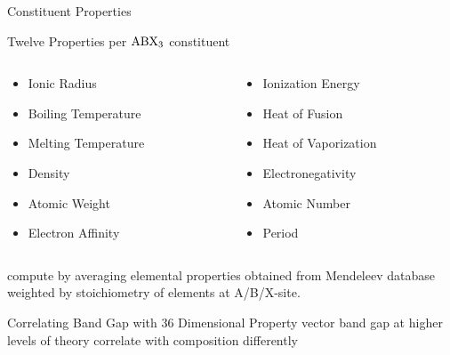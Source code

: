 \documentclass[10pt, aspectratio=169, presentation]{beamer}
\begin{document}
\begin{frame}[label={sec:org8a3778e}]{Constituent Properties}
\begin{block}{Twelve Properties per \(\ce{ABX_3}\) constituent}
\begin{columns}
\begin{column}{0.5\columnwidth}
\begin{itemize}
\item Ionic Radius
\item Boiling Temperature
\item Melting Temperature
\item Density
\item Atomic Weight
\item Electron Affinity
\end{itemize}
\end{column}
\begin{column}{0.5\columnwidth}
\begin{itemize}
\item Ionization Energy
\item Heat of Fusion
\item Heat of Vaporization
\item Electronegativity
\item Atomic Number
\item Period
\end{itemize}
\end{column}
\end{columns}
\end{block}

compute by averaging elemental properties obtained from Mendeleev database
\autocite{mentel-2014}
weighted by stoichiometry of elements at A/B/X-site.
\end{frame}

\begin{frame}[label={sec:orgba4745d}]{Correlating Band Gap with 36 Dimensional Property vector}
band gap at higher levels of theory correlate with composition differently\autocite{yang-2023-high-throug}

 
\begin{center}

\end{center}
\end{frame}
\end{document}
